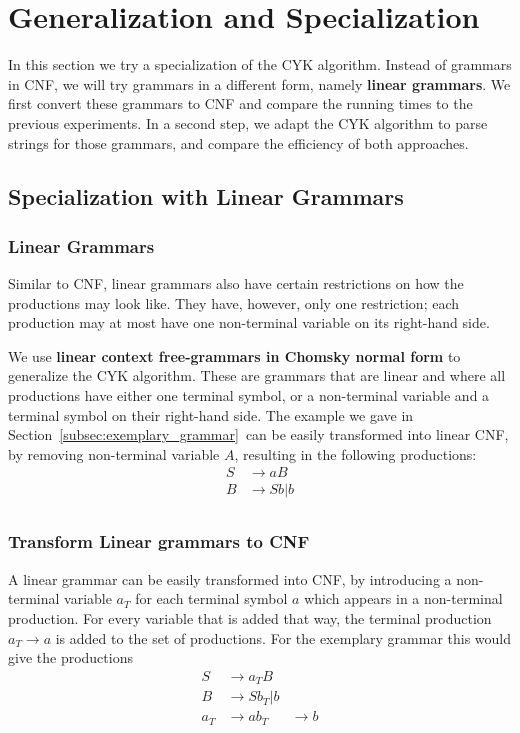 \section{Generalization and Specialization}
\label{sec:specialization}

In this section we try a specialization of the CYK algorithm. 
Instead of grammars in CNF, we will try grammars in a different form, namely \textbf{linear grammars}.
We first convert these grammars to CNF and compare the running times to the previous experiments.
In a second step, we adapt the CYK algorithm to parse strings for those grammars, and compare the efficiency of both approaches.

\subsection{Specialization with Linear Grammars}

\subsubsection{Linear Grammars}
Similar to CNF, linear grammars also have certain restrictions on how the productions may look like.
They have, however, only one restriction; each production may at most have one non-terminal variable on its right-hand side.

We use \textbf{linear context free-grammars in Chomsky normal form} to generalize the CYK algorithm.
These are grammars that are linear and where all productions have either one terminal symbol, or a non-terminal variable and a terminal symbol on their right-hand side.
The example we gave in Section~\ref{subsec:exemplary_grammar}~can be easily transformed into linear CNF, by removing non-terminal variable $A$, resulting in the following productions:
\begin{align*}
    S&\rightarrow aB \\
    B&\rightarrow Sb|b \\
\end{align*}


\subsubsection{Transform Linear grammars to CNF}
A linear grammar can be easily transformed into CNF, by introducing a non-terminal variable $a_T$ for each terminal symbol $a$ which appears in a non-terminal production.
For every variable that is added that way, the terminal production $a_T\rightarrow a$ is added to the set of productions.
For the exemplary grammar this would give the productions
\begin{align*}
    S&\rightarrow a_T B \\
    B&\rightarrow Sb_T|b \\
    a_T&\rightarrow a
    b_T&\rightarrow b
\end{align*}

